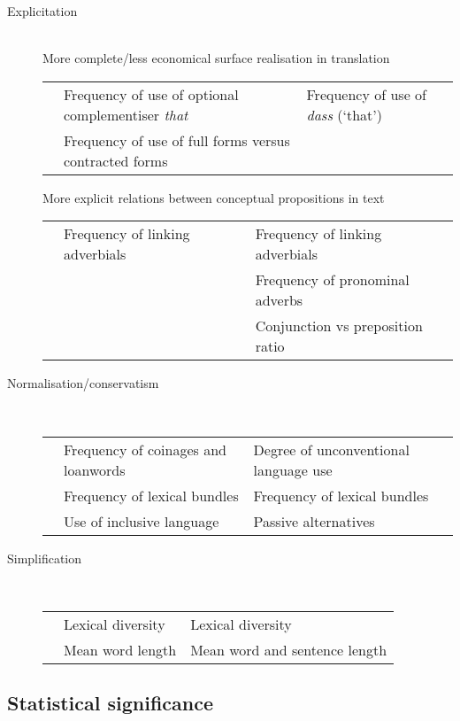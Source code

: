 \documentclass[output=paper]{LSP/langsci}
\begin{document}
\begin{description}
  \item[Explicitation]\hfill\\
    More complete\slash less economical surface realisation in translation

    \begin{tabular}{lp{51mm}p{51mm}}
      & Frequency of use of optional complementiser \emph{that} & Frequency of use of \emph{dass} (`that')\\
      & Frequency of use of full forms versus contracted forms & \\
    \end{tabular}
       
    More explicit relations between conceptual propositions in text

    \begin{tabular}{lp{51mm}p{51mm}}
      & Frequency of linking adverbials & Frequency of linking adverbials\\
      & & Frequency of pronominal adverbs\\
      & & Conjunction vs preposition ratio\\
    \end{tabular}
  \item[Normalisation\slash conservatism]\hfill\\

    \begin{tabular}{lp{51mm}p{51mm}}
      & Frequency of coinages and loanwords & Degree of unconventional language use\\
      & Frequency of lexical bundles & Frequency of lexical bundles\\
      & Use of inclusive language & Passive alternatives\\
    \end{tabular}
  \item[Simplification]\hfill\\

    \begin{tabular}{lp{51mm}p{51mm}}
      & Lexical diversity & Lexical diversity\\
      & Mean word length & Mean word and sentence length\\
    \end{tabular}
\end{description}

\subsection{Statistical significance}\label{bisiada:sec:statsig}
\end{document}
